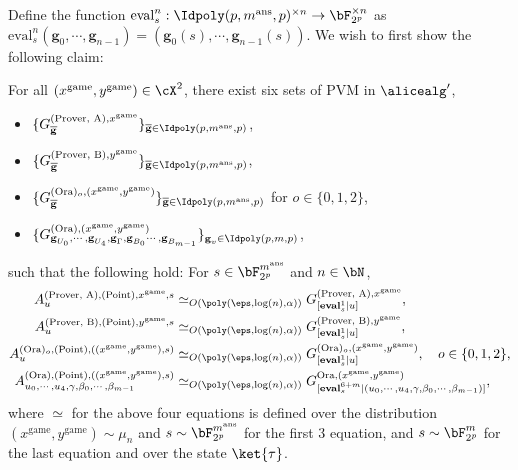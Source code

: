 Define the function $\text{eval}_s^n: \Idpoly(p,m^{\text{ans}},p)^{\times n} \rightarrow \bF_{2^p}^{\times n}$ as $\text{eval}_s^n(\textbf{g}_0, \cdots, \textbf{g}_{n-1}) = (\textbf{g}_0(s),\cdots ,\textbf{g}_{n-1}(s))$. We wish to first show the following claim:
\newcommand{\game}{\text{game}}
\begin{claim} \label{claim:ARpolyPVM}
	For all $(x^{\game},y^{\game}) \in \cX^2$, there exist six sets of PVM in $\alicealg'$, 
	\begin{itemize}
		\item $\{G_{\overline{\textbf{g}}}^{(\text{Prover, A}), x^{\game}}\}_{\overline{\textbf{g}} \in \Idpoly(p,m^{\text{ans}},p)}$,
		\item $\{G_{\overline{\textbf{g}}}^{(\text{Prover, B}), y^{\game}}\}_{\overline{\textbf{g}} \in \Idpoly(p,m^{\text{ans}},p)}$,
		\item $\{G_{\overline{\textbf{g}}}^{(\text{Ora})_{o}, (x^{\game}, y^{\game})}\}_{\overline{\textbf{g}} \in \Idpoly(p,m^{\text{ans}},p)}$ for $o \in \{0,1,2\}$,
		\item $\{G_{\textbf{g}_{U_0}, \cdots, \textbf{g}_{U_4}, \textbf{g}_{\Gamma}, \textbf{g}_{B_0} \cdots,\textbf{g}_{B_{m-1}}}^{(\text{Ora}), (x^{\game}, y^{\game})}\}_{\textbf{g}_v \in \Idpoly(p,m,p)}$, 
	\end{itemize}
	such that the following hold: For $s \in \bF_{2^p}^{m^{\text{ans}}}$ and $n \in \bN$,
	\begin{align}
		\label{eq:ARsoundAlicepoly} A^{(\text{Prover, A}), (\text{Point}), x^{\game} ,s}_{u} &\simeq_{O(\poly(\eps, \log(n), \alpha))} G_{[\textbf{eval}_{s}^1 | u]}^{(\text{Prover, A}), x^{\game}}, \\
		\label{eq:ARsoundBobpoly} A^{(\text{Prover, B}), (\text{Point}), y^{\game} ,s}_{u} &\simeq_{O(\poly(\eps, \log(n), \alpha))} G_{[\textbf{eval}_{s}^1 | u]}^{(\text{Prover, B}), y^{\game}}, \\
		\label{eq:ARsoundvarpoly}  A^{(\text{Ora})_{o}, (\text{Point}), ((x^{\game}, y^{\game}) ,s)}_{u} &\simeq_{O(\poly(\eps, \log(n), \alpha))} G_{[\textbf{eval}_{s}^1 | u]}^{(\text{Ora})_{o}, (x^{\game}, y^{\game})}, \quad o \in \{0,1,2\}, \\
		\label{eq:ARsoundAllpoly} A^{(\text{Ora}), (\text{Point}), ((x^{\game}, y^{\game}) ,s)}_{u_0, \cdots, u_4, \gamma, \beta_0, \cdots,\beta_{m-1}} &\simeq_{O(\poly(\eps, \log(n), \alpha))} G_{[\textbf{eval}_s^{6+m}|( u_0, \cdots, u_4, \gamma, \beta_0, \cdots,\beta_{m-1})]}^{\text{Ora}, (x^{\game}, y^{\game})}, 
	\end{align}
	where $\simeq$ for the above four equations is defined over the distribution $(x^{\game}, y^{\game}) \sim \mu_n$ and $s \sim \bF_{2^p}^{m^{\text{ans}}}$ for the first 3 equation, and $s \sim \bF_{2^p}^{m}$ for the last equation and over the state $\ket{\tau}$.
\end{claim}

